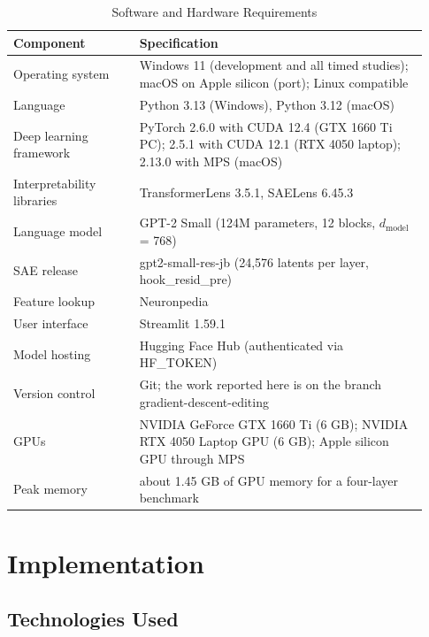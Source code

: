 \documentclass[12pt,a4paper]{report}
\begin{document}
\begin{table}[H]
\centering
\caption{Software and Hardware Requirements}\label{tab:environment}
{\small\renewcommand{\arraystretch}{1.15}
\begin{tabular}{|>{\raggedright\arraybackslash}p{0.285\linewidth}|>{\raggedright\arraybackslash}p{0.643\linewidth}|}
\hline
\textbf{Component} & \textbf{Specification} \\ \hline
Operating system & Windows 11 (development and all timed studies); macOS on Apple silicon (port); Linux compatible \\ \hline
Language & Python 3.13 (Windows), Python 3.12 (macOS) \\ \hline
Deep learning framework & PyTorch 2.6.0 with CUDA 12.4 (GTX 1660 Ti PC); 2.5.1 with CUDA 12.1 (RTX 4050 laptop); 2.13.0 with MPS (macOS) \\ \hline
Interpretability libraries & TransformerLens 3.5.1, SAELens 6.45.3 \\ \hline
Language model & GPT-2 Small (124M parameters, 12 blocks, $d_{\text{model}}$ = 768) \\ \hline
SAE release & gpt2-small-res-jb (24,576 latents per layer, hook\_resid\_pre) \\ \hline
Feature lookup & Neuronpedia \\ \hline
User interface & Streamlit 1.59.1 \\ \hline
Model hosting & Hugging Face Hub (authenticated via HF\_TOKEN) \\ \hline
Version control & Git; the work reported here is on the branch gradient-descent-editing \\ \hline
GPUs & NVIDIA GeForce GTX 1660 Ti (6 GB); NVIDIA RTX 4050 Laptop GPU (6 GB); Apple silicon GPU through MPS \\ \hline
Peak memory & about 1.45 GB of GPU memory for a four-layer benchmark \\ \hline
\end{tabular}}
\end{table}

\chapter{Implementation}\label{ch:implementation}

\section{Technologies Used}
\end{document}
